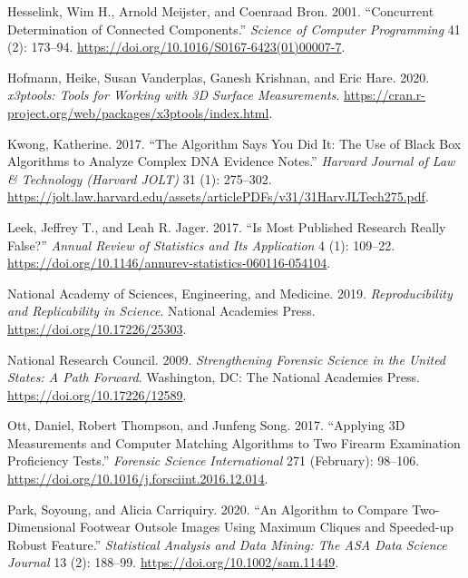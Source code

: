 \begin{CSLReferences}{1}{0}
\leavevmode{}%
Hesselink, Wim H., Arnold Meijster, and Coenraad Bron. 2001. {``Concurrent Determination of Connected Components.''} \emph{Science of Computer Programming} 41 (2): 173--94. \url{https://doi.org/10.1016/S0167-6423(01)00007-7}.

\leavevmode{}%
Hofmann, Heike, Susan Vanderplas, Ganesh Krishnan, and Eric Hare. 2020. \emph{{x3ptools: Tools for Working with 3D Surface Measurements}}. \url{https://cran.r-project.org/web/packages/x3ptools/index.html}.

\leavevmode{}%
Kwong, Katherine. 2017. {``The {Algorithm} {Says} {You} {Did} {It}: {The} {Use} of {Black} {Box} {Algorithms} to {Analyze} {Complex} {DNA} {Evidence} {Notes}.''} \emph{Harvard Journal of Law \& Technology (Harvard JOLT)} 31 (1): 275--302. \url{https://jolt.law.harvard.edu/assets/articlePDFs/v31/31HarvJLTech275.pdf}.

\leavevmode{}%
Leek, Jeffrey T., and Leah R. Jager. 2017. {``Is {Most} {Published} {Research} {Really} {False}?''} \emph{Annual Review of Statistics and Its Application} 4 (1): 109--22. \url{https://doi.org/10.1146/annurev-statistics-060116-054104}.

\leavevmode{}%
National Academy of Sciences, Engineering, and Medicine. 2019. \emph{Reproducibility and Replicability in Science}. National Academies Press. \url{https://doi.org/10.17226/25303}.

\leavevmode{}%
National Research Council. 2009. \emph{Strengthening {Forensic} {Science} in the {United} {States}: {A} {Path} {Forward}}. Washington, DC: The National Academies Press. \url{https://doi.org/10.17226/12589}.

\leavevmode{}%
Ott, Daniel, Robert Thompson, and Junfeng Song. 2017. {``Applying {3D} Measurements and Computer Matching Algorithms to Two Firearm Examination Proficiency Tests.''} \emph{Forensic Science International} 271 (February): 98--106. \url{https://doi.org/10.1016/j.forsciint.2016.12.014}.

\leavevmode{}%
Park, Soyoung, and Alicia Carriquiry. 2020. {``An Algorithm to Compare Two-Dimensional Footwear Outsole Images Using Maximum Cliques and Speeded-up Robust Feature.''} \emph{Statistical Analysis and Data Mining: The ASA Data Science Journal} 13 (2): 188--99. \url{https://doi.org/10.1002/sam.11449}.


\end{CSLReferences}
